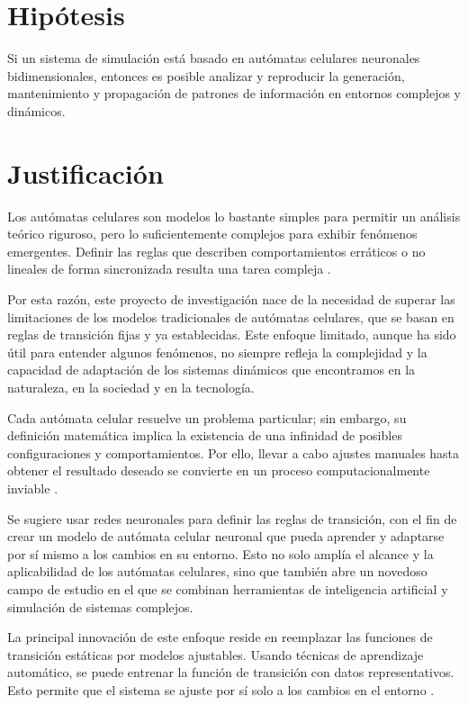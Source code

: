 \section{Hipótesis}

Si un sistema de simulación está basado en autómatas celulares neuronales bidimensionales, entonces es posible analizar y reproducir la generación, mantenimiento y propagación de patrones de información en entornos complejos y dinámicos.

\section{Justificación}

Los autómatas celulares son modelos lo bastante simples para permitir un análisis teórico riguroso, pero lo suficientemente complejos para exhibir fenómenos emergentes. Definir las reglas que describen comportamientos erráticos o no lineales de forma sincronizada resulta una tarea compleja \cite{computationalBiology2016}. 

Por esta razón, este proyecto de investigación nace de la necesidad de superar las limitaciones de los modelos tradicionales de autómatas celulares, que se basan en reglas de transición fijas y ya establecidas. Este enfoque limitado, aunque ha sido útil para entender algunos fenómenos, no siempre refleja la complejidad y la capacidad de adaptación de los sistemas dinámicos que encontramos en la naturaleza, en la sociedad y en la tecnología. 

Cada autómata celular resuelve un problema particular; sin embargo, su definición matemática implica la existencia de una infinidad de posibles configuraciones y comportamientos. Por ello, llevar a cabo ajustes manuales hasta obtener el resultado deseado se convierte en un proceso computacionalmente inviable \cite{elYacoubi2021control}. 

Se sugiere usar redes neuronales para definir las reglas de transición, con el fin de crear un modelo de autómata celular neuronal que pueda aprender y adaptarse por sí mismo a los cambios en su entorno. Esto no solo amplía el alcance y la aplicabilidad de los autómatas celulares, sino que también abre un novedoso campo de estudio en el que se combinan herramientas de inteligencia artificial y simulación de sistemas complejos. 

La principal innovación de este enfoque reside en reemplazar las funciones de transición estáticas por modelos ajustables. Usando técnicas de aprendizaje automático, se puede entrenar la función de transición con datos representativos. Esto permite que el sistema se ajuste por sí solo a los cambios en el entorno \cite{pre}. 

